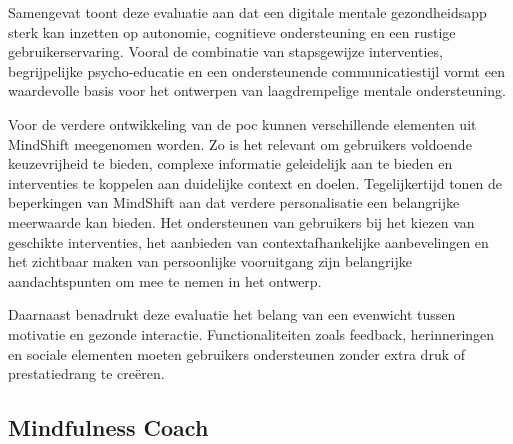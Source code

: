 {\begin{longtable}
        \addlinespace[10pt]
        
    \end{longtable}
}

Samengevat toont deze evaluatie aan dat een digitale mentale gezondheidsapp sterk kan inzetten op autonomie, cognitieve ondersteuning en een rustige gebruikerservaring. Vooral de combinatie van stapsgewijze interventies, begrijpelijke psycho-educatie en een ondersteunende communicatiestijl vormt een waardevolle basis voor het ontwerpen van laagdrempelige mentale ondersteuning.

\vspace{1em}

Voor de verdere ontwikkeling van de \acrshort{poc} kunnen verschillende elementen uit MindShift meegenomen worden. Zo is het relevant om gebruikers voldoende keuzevrijheid te bieden, complexe informatie geleidelijk aan te bieden en interventies te koppelen aan duidelijke context en doelen. Tegelijkertijd tonen de beperkingen van MindShift aan dat verdere personalisatie een belangrijke meerwaarde kan bieden. Het ondersteunen van gebruikers bij het kiezen van geschikte interventies, het aanbieden van contextafhankelijke aanbevelingen en het zichtbaar maken van persoonlijke vooruitgang zijn belangrijke aandachtspunten om mee te nemen in het ontwerp.

\vspace{1em}

Daarnaast benadrukt deze evaluatie het belang van een evenwicht tussen motivatie en gezonde interactie. Functionaliteiten zoals feedback, herinneringen en sociale elementen moeten gebruikers ondersteunen zonder extra druk of prestatiedrang te creëren.

\newpage

\subsection{Mindfulness Coach}
\label{subsec:mindfulness-coach}

